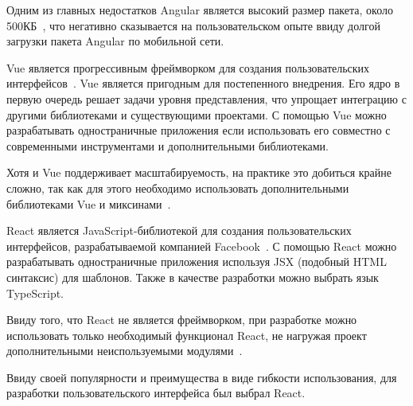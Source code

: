 Одним из главных недостатков Angular является высокий размер пакета, около 500КБ~\cite{stateofjs}, что негативно сказывается на пользовательском опыте ввиду долгой загрузки пакета Angular по мобильной сети.

Vue является прогрессивным фреймворком для создания пользовательских интерфейсов~\cite{vue}. Vue является пригодным для постепенного внедрения. Его ядро в первую очередь решает задачи уровня представления, что упрощает интеграцию с другими библиотеками и существующими проектами. С помощью Vue можно разрабатывать одностраничные приложения если использовать его совместно с современными инструментами и дополнительными библиотеками.

Хотя и Vue поддерживает масштабируемость, на практике это добиться крайне сложно, так как для этого необходимо использовать дополнительными библиотеками Vue и миксинами~\cite{vue}.

React является JavaScript-библиотекой для создания пользовательских интерфейсов, разрабатываемой компанией Facebook~\cite{react}. С помощью React можно разрабатывать одностраничные приложения используя JSX (подобный HTML синтаксис) для шаблонов. Также в качестве разработки можно выбрать язык TypeScript.

Ввиду того, что React не является фреймворком, при разработке можно использовать только необходимый функционал React, не нагружая проект дополнительными неиспользуемыми модулями~\cite{react}.

Ввиду своей популярности и преимущества в виде гибкости использования, для разработки пользовательского интерфейса был выбрал React.
